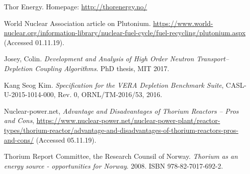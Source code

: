 \documentclass[norsk,a4paper,12pt]{article}
\begin{document}
\begin{multicols}{2}
\begin{thebibliography}{999}
Thor Energy. Homepage: \href{http://thorenergy.no/}{http://thorenergy.no/}

World Nuclear Association article on Plutonium. \href{https://www.world-nuclear.org/information-library/nuclear-fuel-cycle/fuel-recycling/plutonium.aspx}{https://www.world-nuclear.org/information-library/nuclear-fuel-cycle/fuel-recycling/plutonium.aspx} (Accessed 01.11.19).

Josey, Colin. \textit{Development and Analysis of High Order Neutron Transport–Depletion Coupling Algorithms}. PhD thesis, MIT 2017.

Kang Seog Kim. \textit{Specification for the VERA Depletion Benchmark Suite}, CASL-U-2015-1014-000, Rev. 0, ORNL/TM-2016/53, 2016.

Nuclear-power.net, \textit{Advantage and Disadvantages of Thorium Reactors – Pros and Cons}, \href{https://www.nuclear-power.net/nuclear-power-plant/reactor-types/thorium-reactor/advantage-and-disadvantages-of-thorium-reactors-pros-and-cons/}{https://www.nuclear-power.net/nuclear-power-plant/reactor-types/thorium-reactor/advantage-and-disadvantages-of-thorium-reactors-pros-and-cons/} (Accessed 05.11.19).

Thorium Report Committee, the Research Counsil of Norway. \textit{Thorium as an energy source - opportunities for Norway}. 2008. ISBN 978-82-7017-692-2.


\end{thebibliography}

\end{multicols}
\end{document}
